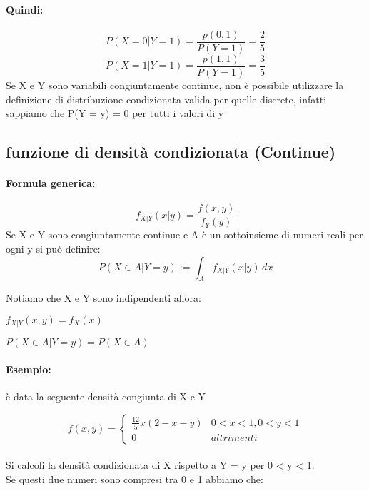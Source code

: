 \documentclass[]{article}
\newcommand{\formula}{\paragraph{Formula generica:}}
\begin{document}
    \paragraph{Quindi:}
    \[ P(X = 0 | Y = 1) = \frac{p(0,1)}{P(Y = 1)} = \frac{2}{5} \]
    \[ P(X = 1 | Y = 1) = \frac{p(1,1)}{P(Y = 1)} = \frac{3}{5} \]
    Se X e Y sono variabili congiuntamente continue, non è possibile utilizzare la
    definizione di distribuzione condizionata valida per quelle discrete, infatti sappiamo
    che P(Y = y) = 0 per tutti i valori di y


    \subsection{funzione di densità condizionata (Continue)}
    \formula
    \[ f_{X|Y}(x | y) = \frac{f(x, y)}{f_Y(y)}\]
    Se X e Y sono congiuntamente continue e A è un sottoinsieme di numeri reali per ogni y si può definire:
    \[ P(X \in A | Y = y) := \int_{A}^{} f_{X|Y}(x | y) \, dx \]

    Notiamo che X e Y sono indipendenti allora:
    \begin{center}
        \begin{minipage}{0.45 \textwidth}
            $ f_{X|Y}(x,y) = f_X(x) $
        \end{minipage}
        \begin{minipage}{0.45 \textwidth}
            $ P(X \in A | Y = y) = P(X \in A) $
        \end{minipage}
    \end{center}


    \paragraph{Esempio:} è data la seguente densità congiunta di X e Y



    \begin{equation*}
        f(x,y) =
        \begin{cases}
            \frac{12}{5} x(2-x-y) & 0 < x < 1, 0 < y < 1 \\
            0 & altrimenti
        \end{cases}
    \end{equation*} \\
    \linebreak[2]
    Si calcoli la densità condizionata di X rispetto a Y = y per 0 < y < 1. \\
    Se questi due numeri sono compresi tra 0 e 1 abbiamo che:
\end{document}
